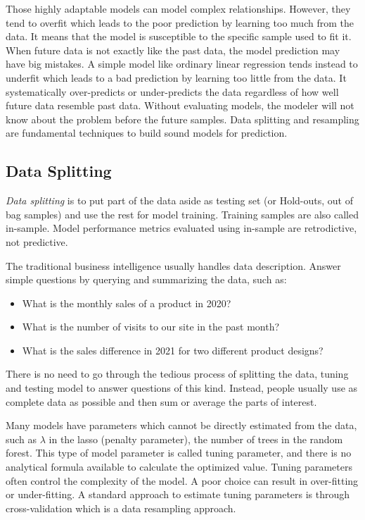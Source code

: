 \documentclass[12pt,]{krantz}
\providecommand{\tightlist}{%
  \setlength{\itemsep}{0pt}\setlength{\parskip}{0pt}}
\begin{document}
Those highly adaptable models can model complex relationships. However, they tend to overfit which leads to the poor prediction by learning too much from the data. It means that the model is susceptible to the specific sample used to fit it. When future data is not exactly like the past data, the model prediction may have big mistakes. A simple model like ordinary linear regression tends instead to underfit which leads to a bad prediction by learning too little from the data. It systematically over-predicts or under-predicts the data regardless of how well future data resemble past data. Without evaluating models, the modeler will not know about the problem before the future samples. Data splitting and resampling are fundamental techniques to build sound models for prediction.

\hypertarget{datasplitting}{%
\subsection{Data Splitting}\label{datasplitting}}

\emph{Data splitting} is to put part of the data aside as testing set (or Hold-outs, out of bag samples) and use the rest for model training. Training samples are also called in-sample. Model performance metrics evaluated using in-sample are retrodictive, not predictive.

The traditional business intelligence usually handles data description. Answer simple questions by querying and summarizing the data, such as:

\begin{itemize}
\tightlist
\item
  What is the monthly sales of a product in 2020?
\item
  What is the number of visits to our site in the past month?
\item
  What is the sales difference in 2021 for two different product designs?
\end{itemize}

There is no need to go through the tedious process of splitting the data, tuning and testing model to answer questions of this kind. Instead, people usually use as complete data as possible and then sum or average the parts of interest.

Many models have parameters which cannot be directly estimated from the data, such as \(\lambda\) in the lasso (penalty parameter), the number of trees in the random forest. This type of model parameter is called tuning parameter, and there is no analytical formula available to calculate the optimized value. Tuning parameters often control the complexity of the model. A poor choice can result in over-fitting or under-fitting. A standard approach to estimate tuning parameters is through cross-validation which is a data resampling approach.
\end{document}
